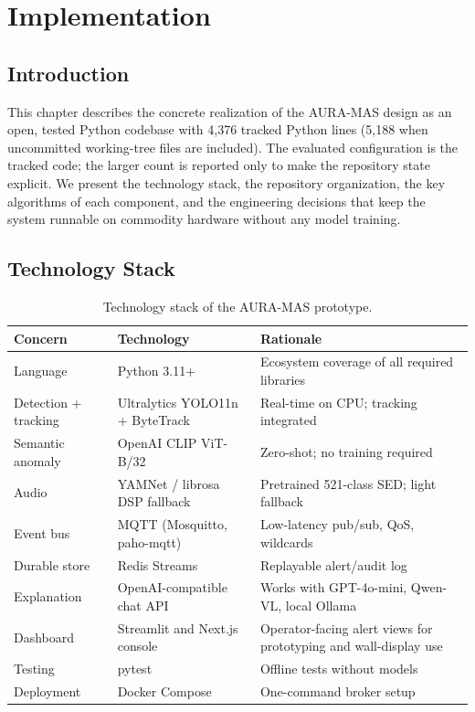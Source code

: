 \chapter{Implementation}
\label{chap:implementation}

\section{Introduction}

This chapter describes the concrete realization of the AURA-MAS design as an open, tested Python codebase with 4{,}376 tracked Python lines (5{,}188 when uncommitted working-tree files are included). The evaluated configuration is the tracked code; the larger count is reported only to make the repository state explicit. We present the technology stack, the repository organization, the key algorithms of each component, and the engineering decisions that keep the system runnable on commodity hardware without any model training.

\section{Technology Stack}

\begin{table}[H]
\centering
\caption{Technology stack of the AURA-MAS prototype.}
\label{tab:stack}
\small
\begin{tabular}{p{3.5cm}p{4.2cm}p{5.3cm}}
\toprule
\textbf{Concern} & \textbf{Technology} & \textbf{Rationale} \\
\midrule
Language & Python 3.11+ & Ecosystem coverage of all required libraries \\
Detection + tracking & Ultralytics YOLO11n + ByteTrack \cite{ultralytics2025yolov8, zhang2022bytetrack} & Real-time on CPU; tracking integrated \\
Semantic anomaly & OpenAI CLIP ViT-B/32 \cite{radford2021clip} & Zero-shot; no training required \\
Audio & YAMNet \cite{tensorflow_yamnet} / librosa DSP fallback & Pretrained 521-class SED; light fallback \\
Event bus & MQTT (Mosquitto, paho-mqtt) \cite{light2017mosquitto} & Low-latency pub/sub, QoS, wildcards \\
Durable store & Redis Streams & Replayable alert/audit log \\
Explanation & OpenAI-compatible chat API & Works with GPT-4o-mini, Qwen-VL, local Ollama \\
Dashboard & Streamlit and Next.js console & Operator-facing alert views for prototyping and wall-display use \\
Testing & pytest & Offline tests without models \\
Deployment & Docker Compose & One-command broker setup \\
\bottomrule
\end{tabular}
\end{table}

